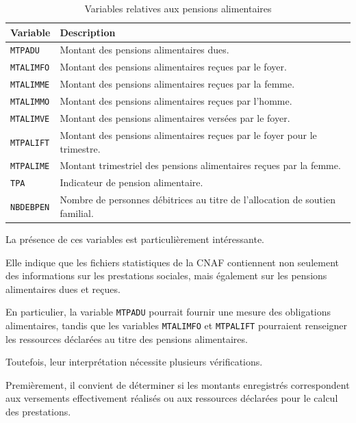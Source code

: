 \documentclass[11pt,a4paper]{article}
\begin{document}
\begin{table}[H]
\centering
\caption{Variables relatives aux pensions alimentaires}
\small
\begin{tabular}{p{2.4cm}p{10.6cm}}
\toprule
\textbf{Variable} & \textbf{Description} \\
\midrule
\texttt{MTPADU} &
Montant des pensions alimentaires dues. \\

\texttt{MTALIMFO} &
Montant des pensions alimentaires reçues
par le foyer. \\

\texttt{MTALIMME} &
Montant des pensions alimentaires reçues
par la femme. \\

\texttt{MTALIMMO} &
Montant des pensions alimentaires reçues
par l'homme. \\

\texttt{MTALIMVE} &
Montant des pensions alimentaires versées
par le foyer. \\

\texttt{MTPALIFT} &
Montant des pensions alimentaires reçues
par le foyer pour le trimestre. \\

\texttt{MTPALIME} &
Montant trimestriel des pensions alimentaires
reçues par la femme. \\

\texttt{TPA} &
Indicateur de pension alimentaire. \\

\texttt{NBDEBPEN} &
Nombre de personnes débitrices au titre
de l'allocation de soutien familial. \\
\bottomrule
\end{tabular}
\end{table}

La présence de ces variables est
particulièrement intéressante.

Elle indique que les fichiers statistiques
de la CNAF contiennent non seulement
des informations sur les prestations
sociales, mais également sur les
pensions alimentaires dues et reçues.

En particulier, la variable
\texttt{MTPADU} pourrait fournir
une mesure des obligations alimentaires,
tandis que les variables
\texttt{MTALIMFO} et
\texttt{MTPALIFT} pourraient renseigner
les ressources déclarées au titre
des pensions alimentaires.

Toutefois, leur interprétation
nécessite plusieurs vérifications.

Premièrement, il convient de déterminer
si les montants enregistrés correspondent
aux versements effectivement réalisés
ou aux ressources déclarées pour
le calcul des prestations.
\end{document}
